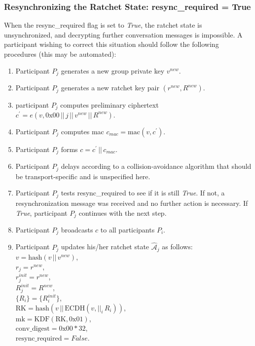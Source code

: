 \documentclass[%
preprint,
amsmath,amssymb,
aps,
prb,
floatfix,
]{revtex4-1}
\begin{document}
\subsubsection{\label{sec:sendresync}Resynchronizing the Ratchet State:
resync\_required = True}
When the resync\_required flag is set to \textit{True}, the ratchet state is
unsynchronized, and decrypting further conversation messages is impossible.
A participant wishing to correct this situation should follow the following
procedures (this may be automated):
\begin{enumerate}
\item Participant $P_j$ generates a new group private key $v^{new}$.
\item Participant $P_j$ generates a new ratchet key  pair $(r^{new}, R^{new})$.
\item participant $P_j$ computes preliminary ciphertext $c^\prime = e(v, 0\mathrm{x}00
\, || \, j \, || \, v^{new} \, || \, R^{new})$.
\item Participant $P_j$ computes mac $c_{mac} = \mathrm{mac}(v, c^\prime)$.
\item Participant $P_j$ forms $c = c^\prime \, || \, c_{mac}$.
\item Participant $P_j$ delays according to a collision-avoidance algorithm
that should be transport-specific and is unspecified here.
\item Participant $P_j$ tests resync\_required to see if it is still
\textit{True}. If not, a resynchronization message was received and no further
action is necessary. If \textit{True}, participant $P_j$ continues with the next
step.
\item Participant $P_j$ broadcasts $c$ to all participants $P_i$.
\item Participant $P_j$ updates his/her ratchet state
$\mathcal{\hat{A}}_j$ as follows:\\
$v = \mathrm{hash}(v \, || \, v^{new})$, \\
$r_j = r^{new}$, \\
$r_j^{init} = r^{new}$, \\
$R_j^{init} = R^{new}$, \\
$\{R_i\} = \{R_i^{init}\}$, \\
$\mathrm{RK} = \mathrm{hash}(v \, || \, \mathrm{ECDH}(v, ||_i
\, R_i))$, \\
$\mathrm{mk} = \mathrm{KDF}(\mathrm{RK}, 0\mathrm{x}01)$, \\
$\mathrm{conv\_digest} = 0\mathrm{x}00 * 32$, \\
$\mathrm{resync\_required} = False$.
\end{enumerate}
\end{document}
